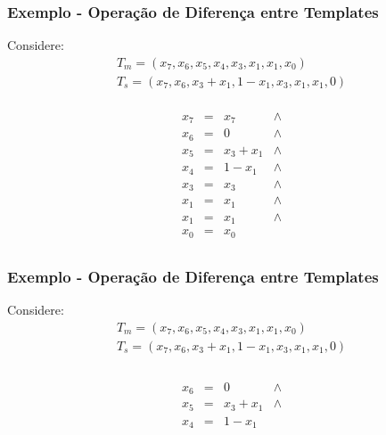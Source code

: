 \documentclass[aspectratio=43,hyperref={pdfpagelabels=false}]{beamer}
\begin{document}
 \begin{frame}
    \frametitle{Exemplo - Operação de Diferença entre Templates}
    Considere:
    \begin{equation*}
    \begin{split}
    T_m = (x_7, x_6, x_5, x_4, x_3, x_1, x_1, x_0) \\
    T_s = (x_7, x_6, x_3 + x_1, 1 - x_1, x_3, x_1, x_1, 0)\\
    \end{split}
    \end{equation*}

    \begin{equation}
      \begin{matrix}
       x_7 & = & x_7       & \wedge  \\
       x_6 & = & 0         & \wedge  \\
       x_5 & = & x_3 + x_1 & \wedge  \\
       x_4 & = &   1 - x_1 & \wedge  \\
       x_3 & = & x_3       & \wedge  \\
       x_1 & = & x_1       & \wedge  \\
       x_1 & = & x_1       & \wedge  \\
       x_0 & = & x_0       &         \\
      \end{matrix}
    \end{equation}

\end{frame}

 \begin{frame}
    \frametitle{Exemplo - Operação de Diferença entre Templates}
    Considere:
    \begin{equation*}
    \begin{split}
    T_m = (x_7, x_6, x_5, x_4, x_3, x_1, x_1, x_0) \\
    T_s = (x_7, x_6, x_3 + x_1, 1 - x_1, x_3, x_1, x_1, 0)\\
    \end{split}
    \end{equation*}


    \begin{equation}
      \begin{matrix}
        &  &               &  \\
       x_6 & = & 0         & \wedge \\
       x_5 & = & x_3 + x_1 & \wedge  \\
       x_4 & = &   1 - x_1 &  \\
        &  &               &  \\
        &  &               &  \\
        &  &               &  \\
        &  &               &  \\
      \end{matrix}
    \end{equation}

\end{frame}
\end{document}
